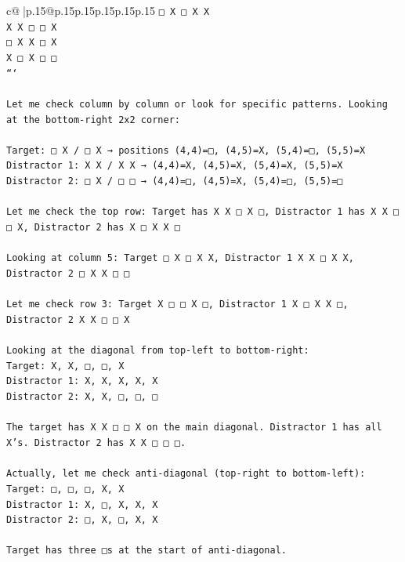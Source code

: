 \documentclass{article}
\begin{document}
{\begin{supertabular}{c@{$\;$}|p{.15\linewidth}@{}p{.15\linewidth}p{.15\linewidth}p{.15\linewidth}p{.15\linewidth}p{.15\linewidth}}
{{{\texttt{□ X □ X X} \\
\texttt{X X □ □ X} \\
\texttt{□ X X □ X} \\
\texttt{X □ X □ □} \\
\texttt{```} \\
\\ 
\texttt{Let me check column by column or look for specific patterns. Looking at the bottom{-}right 2x2 corner:} \\
\\ 
\texttt{Target: □ X / □ X → positions (4,4)=□, (4,5)=X, (5,4)=□, (5,5)=X} \\
\texttt{Distractor 1: X X / X X → (4,4)=X, (4,5)=X, (5,4)=X, (5,5)=X} \\
\texttt{Distractor 2: □ X / □ □ → (4,4)=□, (4,5)=X, (5,4)=□, (5,5)=□} \\
\\ 
\texttt{Let me check the top row: Target has X X □ X □, Distractor 1 has X X □ □ X, Distractor 2 has X □ X X □} \\
\\ 
\texttt{Looking at column 5: Target □ X □ X X, Distractor 1 X X □ X X, Distractor 2 □ X X □ □} \\
\\ 
\texttt{Let me check row 3: Target X □ □ X □, Distractor 1 X □ X X □, Distractor 2 X X □ □ X} \\
\\ 
\texttt{Looking at the diagonal from top{-}left to bottom{-}right:} \\
\texttt{Target: X, X, □, □, X} \\
\texttt{Distractor 1: X, X, X, X, X} \\
\texttt{Distractor 2: X, X, □, □, □} \\
\\ 
\texttt{The target has X X □ □ X on the main diagonal. Distractor 1 has all X's. Distractor 2 has X X □ □ □.} \\
\\ 
\texttt{Actually, let me check anti{-}diagonal (top{-}right to bottom{-}left):} \\
\texttt{Target: □, □, □, X, X} \\
\texttt{Distractor 1: X, □, X, X, X} \\
\texttt{Distractor 2: □, X, □, X, X} \\
\\ 
\texttt{Target has three □s at the start of anti{-}diagonal.} \\
\\ 
}}}
\end{supertabular}}
\end{document}
